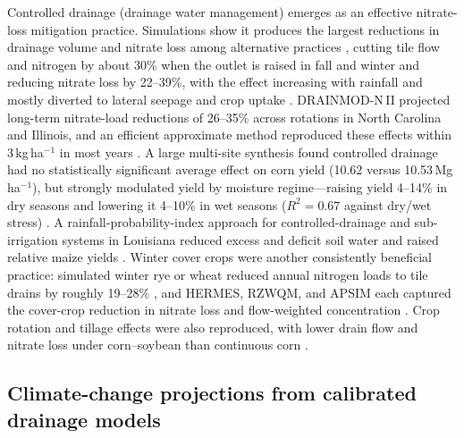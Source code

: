 Controlled drainage (drainage water management) emerges as an effective nitrate-loss mitigation practice. Simulations show it produces the largest reductions in drainage volume and nitrate loss among alternative practices \parencite{Luo2010,Ma2007b}, cutting tile flow and nitrogen by about 30\% when the outlet is raised in fall and winter \parencite{Ahuja2007} and reducing nitrate loss by 22--39\%, with the effect increasing with rainfall and mostly diverted to lateral seepage and crop uptake \parencite{Fang2012,Negm2017}. DRAINMOD-N\,II projected long-term nitrate-load reductions of 26--35\% across rotations in North Carolina and Illinois, and an efficient approximate method reproduced these effects within 3\,kg\,ha$^{-1}$ in most years \parencite{Skaggs2012,Negm2016}. A large multi-site synthesis found controlled drainage had no statistically significant average effect on corn yield (10.62 versus 10.53\,Mg\,ha$^{-1}$), but strongly modulated yield by moisture regime---raising yield 4--14\% in dry seasons and lowering it 4--10\% in wet seasons ($R^2 = 0.67$ against dry/wet stress) \parencite{Youssef2023}. A rainfall-probability-index approach for controlled-drainage and sub-irrigation systems in Louisiana reduced excess and deficit soil water and raised relative maize yields \parencite{COOPER1988}. Winter cover crops were another consistently beneficial practice: simulated winter rye or wheat reduced annual nitrogen loads to tile drains by roughly 19--28\% \parencite{Singer2011}, and HERMES, RZWQM, and APSIM each captured the cover-crop reduction in nitrate loss and flow-weighted concentration \parencite{Malone2017,Gillette2018,Malone2007c}. Crop rotation and tillage effects were also reproduced, with lower drain flow and nitrate loss under corn--soybean than continuous corn \parencite{Ma2007b,Malone2007c}.

\subsection{Climate-change projections from calibrated drainage models}

